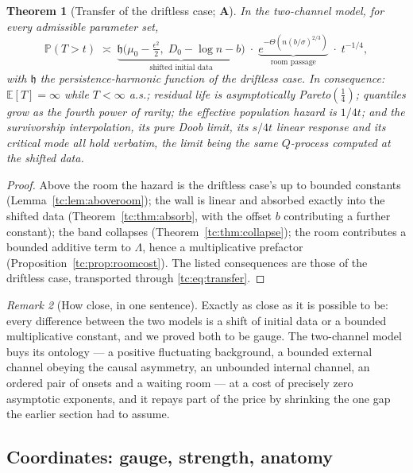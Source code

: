 \documentclass[11pt]{article}
\numberwithin{equation}{section}
\theoremstyle{plain}
\newtheorem{theorem}{Theorem}[section]
\theoremstyle{definition}
\theoremstyle{remark}
\newtheorem{remark}[theorem]{Remark}
\newcommand{\E}{\mathbb{E}}
\newcommand{\PP}{\mathbb{P}}
\newcommand{\hm}{\mathfrak{h}}
\begin{document}
\begin{theorem}[Transfer of the driftless case; \textbf{A}]
\label{tc:thm:transfer}
In the two-channel model, for every admissible parameter set,
\begin{equation}\label{tc:eq:transfer}
\PP(T>t)\;\asymp\;\underbrace{\hm\bigl(\mu_{0}-\tfrac{\epsilon^{2}}{2},
\;D_{0}-\log n-b\bigr)}_{\text{shifted initial data}}\;\cdot\;
\underbrace{e^{-\Theta\left(n(b/\sigma)^{2/3}\right)}}_{\text{room
passage}}\;\cdot\;t^{-1/4},
\end{equation}
with $\hm$ the persistence-harmonic function of the driftless case. In
consequence: $\E[T]=\infty$ while $T<\infty$ a.s.; residual life is
asymptotically Pareto$(\tfrac14)$; quantiles grow as the fourth power of
rarity; the effective population hazard is $1/4t$; and the survivorship
interpolation, its pure Doob limit, its $s/4t$ linear response and its
critical mode all hold verbatim, the limit being the same $Q$-process
computed at the shifted data.
\end{theorem}

\begin{proof}
Above the room the hazard is the driftless case's up to bounded constants
(Lemma~\ref{tc:lem:aboveroom}); the wall is linear and absorbed exactly
into the shifted data (Theorem~\ref{tc:thm:absorb}, with the offset $b$
contributing a further constant); the band collapses
(Theorem~\ref{tc:thm:collapse}); the room contributes a bounded additive
term to $\Lambda$, hence a multiplicative prefactor
(Proposition~\ref{tc:prop:roomcost}). The listed consequences are those
of the driftless case, transported through
\eqref{tc:eq:transfer}.
\end{proof}

\begin{remark}[How close, in one sentence]\label{tc:rem:howclose}
Exactly as close as it is possible to be: every difference between the
two models is a shift of initial data or a bounded multiplicative
constant, and we proved both to be gauge. The two-channel model
buys its ontology --- a positive fluctuating background, a bounded
external channel obeying the causal asymmetry, an unbounded internal
channel, an ordered pair of onsets and a waiting room --- at a cost of
precisely zero asymptotic exponents, and it repays part of the price by
shrinking the one gap the earlier section had to assume.
\end{remark}

\subsection{Coordinates: gauge, strength, anatomy}\label{gr1:sub:coords}\label{tc:sub:polar}
\end{document}
